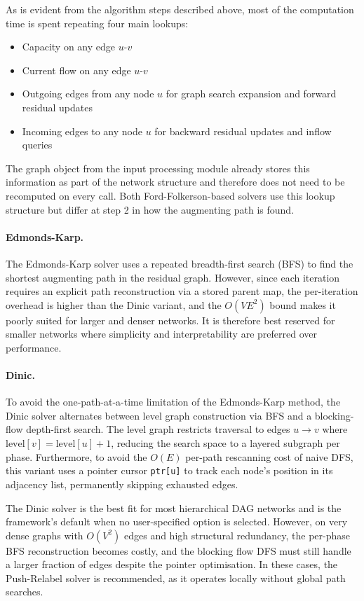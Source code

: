 \documentclass[12pt]{report}
\begin{document}
As is evident from the algorithm steps described above, most of the computation
time is spent repeating four main lookups:

\begin{itemize}
\item Capacity on any edge $u$-$v$
\item Current flow on any edge $u$-$v$
\item Outgoing edges from any node $u$ for graph search expansion
and forward residual updates
\item Incoming edges to any node $u$ for backward residual updates
and inflow queries
\end{itemize}

The graph object from the input processing module already stores this information as
part of the network structure and therefore does not need to be
recomputed on every call. Both Ford-Folkerson-based solvers use this lookup structure 
but differ at step 2 in how the augmenting path is found.

\paragraph{Edmonds-Karp.} 
The Edmonds-Karp solver uses a repeated breadth-first search (BFS) to find the shortest augmenting path in the residual graph. However, since each iteration requires an explicit path reconstruction via a stored parent map, the per-iteration overhead is higher than the Dinic variant, and the $O(VE^2)$ bound makes it poorly suited for larger and denser networks. It is therefore best reserved for smaller networks where simplicity and interpretability are preferred over performance.

\paragraph{Dinic.} 
To avoid the one-path-at-a-time limitation of the Edmonds-Karp method, the Dinic solver alternates between level graph construction via BFS and a blocking-flow depth-first search. The level graph restricts traversal to edges $u \to v$ where $\text{level}[v] = \text{level}[u] + 1$, reducing the search space to a layered subgraph per phase. Furthermore, to avoid the $O(E)$ per-path rescanning cost of naive DFS, this variant uses a pointer cursor \texttt{ptr[u]} to track each node's position in its adjacency list, permanently skipping exhausted edges. 

The Dinic solver is the best fit for most hierarchical DAG networks and is the framework's default when no user-specified option is selected. However, on very dense graphs with $O(V^2)$ edges and high structural redundancy, the per-phase BFS reconstruction becomes costly, and the blocking flow DFS must still handle a larger fraction of edges despite the pointer optimisation. In these cases, the Push-Relabel solver is recommended, as it operates locally without global path searches.
\end{document}
